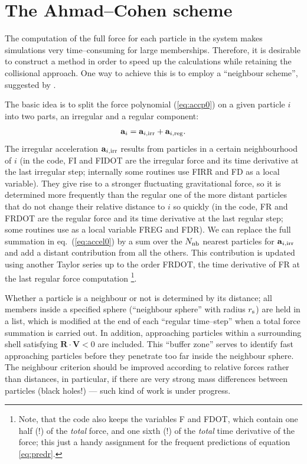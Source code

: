
\section{The Ahmad--Cohen scheme}


The computation of the full force for each particle
in the system makes simulations very time--consuming
for large memberships.
Therefore, it is desirable to construct a method in
order to speed up the calculations while retaining
the collisional approach.
One way to achieve this is to employ a ``neighbour scheme'',
suggested by \cite{ac_73}.


The basic idea is to split the force polynomial (\ref{eq:accp0})
on a given particle $i$ into two parts, an irregular and a
regular component:
%
\begin{eqnarray}
\mathbf a_i = \mathbf a_{i,{\rm irr}} + \mathbf a_{i,{\rm reg}} .
\end{eqnarray}
%
The irregular acceleration $\mathbf a_{i,{\rm irr}}$ results
from particles in a certain neighbourhood of $i$
(in the code, FI and FIDOT are the irregular force and its
time derivative at the last irregular step;
internally some routines use FIRR and FD as a local variable).
They give rise to a stronger fluctuating gravitational force,
so it is determined more frequently than the regular one
of the more distant particles that do not change their
relative distance to $i$ so quickly
(in the code, FR and FRDOT are the regular force and its time
derivative at the last regular step; some routines use
as a local variable FREG and FDR).
We can replace the full summation in eq.~(\ref{eq:accel0})
by a sum over the $N_{\rm nb}$ nearest particles for
$\mathbf a_{i,{\rm irr}}$
and add a distant contribution from all the others.
This contribution is updated using another Taylor series
up to the order FRDOT, the time derivative of FR at the
last regular force computation%
%
\footnote{Note, that the code also keeps the variables F and FDOT,
which contain one half (!) of the \emph{total} force,
and one sixth (!) of the \emph{total} time derivative of the force;
this just a handy assignment for the frequent predictions of
equation \ref{eq:predr}. }.

Whether a particle is a neighbour or not is determined
by its distance;
all members inside a specified sphere (``neighbour sphere''
with radius $r_{\rm s}$) are held in a list,
which is modified at the end of each ``regular time--step''
when a total force summation is carried out.
In addition, approaching particles within a surrounding
shell satisfying $\mathbf R \cdot \mathbf V < 0$ are
included.
This ``buffer zone'' serves to identify fast approaching
particles before they penetrate too far inside the
neighbour sphere.
The neighbour criterion should be improved according to relative
forces rather than distances, in particular, if there are very
strong mass differences between particles (black holes!)
--- such kind of work is under progress.


